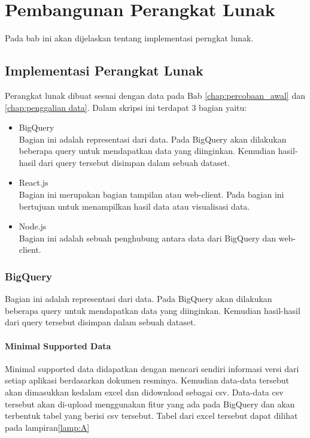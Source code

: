 \chapter{Pembangunan Perangkat Lunak}
\label{chap:pembangunan PL}
Pada bab ini akan dijelaskan tentang implementasi perngkat lunak.
\section{Implementasi Perangkat Lunak}
Perangkat lunak dibuat sesuai dengan data pada Bab \ref{chap:percobaan_awal} dan \ref{chap:penggalian data}. Dalam skripsi ini terdapat 3 bagian yaitu:
\begin{itemize}
	\item BigQuery\\
	Bagian ini adalah representasi dari data. Pada BigQuery akan dilakukan beberapa query untuk mendapatkan data yang diinginkan. Kemudian hasil-hasil dari query tersebut disimpan dalam sebuah dataset.
	\item React.js\\
	Bagian ini merupakan bagian tampilan atau web-client. Pada bagian ini bertujuan untuk menampilkan hasil data atau visualisasi data.
	\item Node.js\\
	Bagian ini adalah sebuah penghubung antara data dari BigQuery dan web-client.
\end{itemize}

\subsection{BigQuery}
Bagian ini adalah representasi dari data. Pada BigQuery akan dilakukan beberapa query untuk mendapatkan data yang diinginkan. Kemudian hasil-hasil dari query tersebut disimpan dalam sebuah dataset.



\subsubsection{Minimal Supported Data}
Minimal supported data didapatkan dengan mencari sendiri informasi versi dari setiap aplikasi berdasarkan dokumen resminya. Kemudian data-data tersebut akan dimasukkan kedalam excel dan didownload sebagai csv. Data-data csv tersebut akan di-upload menggunakan fitur yang ada pada BigQuery dan akan terbentuk tabel yang berisi csv tersebut. Tabel dari excel tersebut dapat dilihat pada lampiran\ref{lamp:A}

